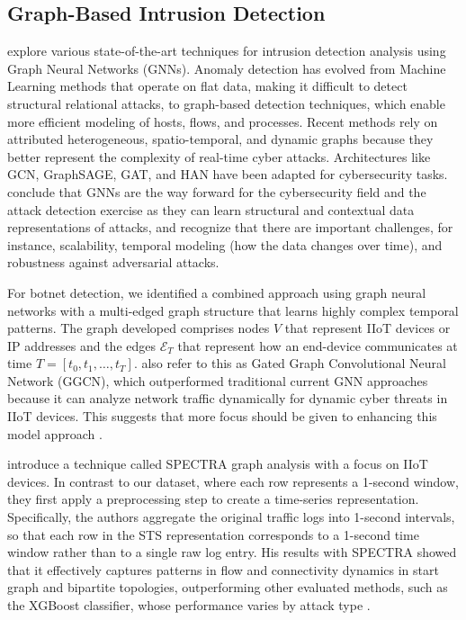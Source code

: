 \documentclass[final,5p,times,twocolumn]{elsarticle}
\begin{document}
\subsection{Graph-Based Intrusion Detection}

\cite{bilot2023graph} explore various state-of-the-art techniques for intrusion detection analysis using Graph Neural Networks (GNNs). Anomaly detection has evolved from Machine Learning methods that operate on flat data, making it difficult to detect structural relational attacks, to graph-based detection techniques, which enable more efficient modeling of hosts, flows, and processes. Recent methods rely on attributed heterogeneous, spatio-temporal, and dynamic graphs because they better represent the complexity of real-time cyber attacks. Architectures like GCN, GraphSAGE, GAT, and HAN have been adapted for cybersecurity tasks. \cite{bilot2023graph} conclude that GNNs are the way forward for the cybersecurity field and the attack detection exercise as they can learn structural and contextual data representations of attacks, and recognize that there are important challenges, for instance, scalability, temporal modeling (how the data changes over time), and robustness against adversarial attacks.

For botnet detection, we identified a combined approach using graph neural networks with a multi-edged graph structure that learns highly complex temporal patterns. The graph developed comprises nodes \(V\) that represent IIoT devices or IP addresses and the edges \(\mathcal{E}_T\) that represent how an end-device communicates at time \(T = [t_0, t_1, \ldots, t_T]\). \cite{altaf_gnn-based_2024} also refer to this as Gated Graph Convolutional Neural Network (GGCN), which outperformed traditional current GNN approaches because it can analyze network traffic dynamically for dynamic cyber threats in IIoT devices. This suggests that more focus should be given to enhancing this model approach \citep{altaf_gnn-based_2024}.

\cite{jaber_spectral_2025} introduce a technique called SPECTRA graph analysis with a focus on IIoT devices. In contrast to our dataset, where each row represents a 1-second window, they first apply a preprocessing step to create a time-series representation. Specifically, the authors aggregate the original traffic logs into 1-second intervals, so that each row in the STS representation corresponds to a 1-second time window rather than to a single raw log entry. His results with SPECTRA showed that it effectively captures patterns in flow and connectivity dynamics in start graph and bipartite topologies, outperforming other evaluated methods, such as the XGBoost classifier, whose performance varies by attack type \citep{jaber_spectral_2025}.
\end{document}
